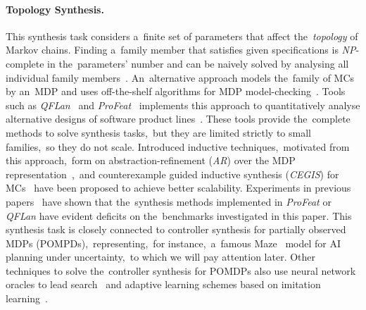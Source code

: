 \paragraph{Topology Synthesis.}
This synthesis task considers a~finite set of parameters that affect the~\textit{topology} of Markov chains.
Finding a~family member that satisfies given specifications is \textit{NP}-complete in the~parameters' number and can be naively solved by analysing all individual family members~\cite{onebyone}.
An~alternative approach models the~family of MCs by an~MDP and uses off-the-shelf algorithms for MDP model-checking~\cite{allinone}.
Tools such as \emph{QFLan}~\cite{qflan} and \emph{ProFeat}~\cite{profeat} implements this approach to quantitatively analyse alternative designs of software product lines~\cite{sw-product-lines}.
These tools provide the~complete methods to solve synthesis tasks,~but they are limited strictly to small families,~so they do not scale.
Introduced inductive techniques,~motivated from this approach,~form on abstraction-refinement (\emph{AR}) over the MDP representation~\cite{cegar},~and counterexample guided inductive synthesis (\emph{CEGIS}) for MCs~\cite{cegis} have been proposed to achieve better scalability.
Experiments in previous papers~\cite{cegar,cegis} have shown that the~synthesis methods implemented in \emph{ProFeat} or \emph{QFLan} have evident deficits on the~benchmarks investigated in this paper.
This synthesis task is closely connected to controller synthesis for partially observed MDPs (POMPDs),~representing,~for instance,~a~famous Maze~\cite{maze} model for AI planning under uncertainty,~to which we will pay attention later.
Other techniques to solve the~controller synthesis for POMDPs also use neural network oracles to lead search~\cite{pomdp-2} and adaptive learning schemes based on imitation learning~\cite{POMDP3}.

